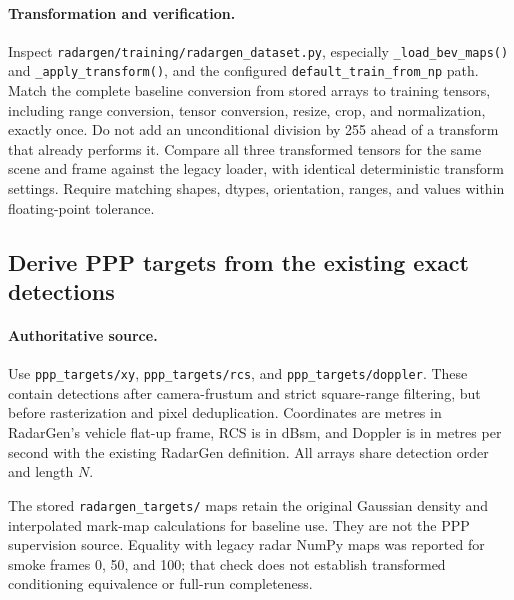 \documentclass[11pt,a4paper]{article}
\begin{document}
\paragraph{Transformation and verification.}
Inspect \texttt{radargen/training/radargen\_dataset.py}, especially \texttt{\_load\_bev\_maps()} and \texttt{\_apply\_transform()}, and the configured \texttt{default\_train\_from\_np} path. Match the complete baseline conversion from stored arrays to training tensors, including range conversion, tensor conversion, resize, crop, and normalization, exactly once. Do not add an unconditional division by 255 ahead of a transform that already performs it. Compare all three transformed tensors for the same scene and frame against the legacy loader, with identical deterministic transform settings. Require matching shapes, dtypes, orientation, ranges, and values within floating-point tolerance.

\subsection{Derive PPP targets from the existing exact detections}

\paragraph{Authoritative source.}
Use \texttt{ppp\_targets/xy}, \texttt{ppp\_targets/rcs}, and \texttt{ppp\_targets/doppler}. These contain detections after camera-frustum and strict square-range filtering, but before rasterization and pixel deduplication. Coordinates are metres in RadarGen's vehicle flat-up frame, RCS is in dBsm, and Doppler is in metres per second with the existing RadarGen definition. All arrays share detection order and length \(N\).

The stored \texttt{radargen\_targets/} maps retain the original Gaussian density and interpolated mark-map calculations for baseline use. They are not the PPP supervision source. Equality with legacy radar NumPy maps was reported for smoke frames 0, 50, and 100; that check does not establish transformed conditioning equivalence or full-run completeness.
\end{document}
